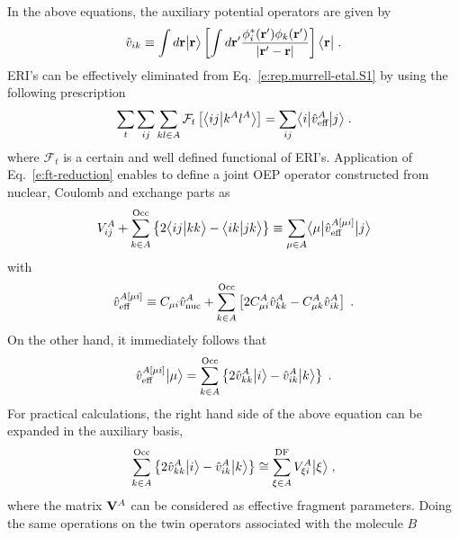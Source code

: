 %
In the above equations, the auxiliary potential operators are given by
%
\begin{equation}
  \hat{v}_{ik} \equiv \int d{\bf r} \Ket{{\bf r}} 
        \left[
        \int d{\bf r}' \frac{\phi_i^{*}({\bf r}') \phi_k({\bf r}')}{\vert {\bf r}' - {\bf r}\vert}
        \right] \Bra{{\bf r}} \;.
\end{equation}
%
ERI's can be effectively eliminated from Eq.~\eqref{e:rep.murrell-etal.S1} 
by using the following prescription~\cite{Blasiak.Bednarska.Choluj.Bartkowiak.JCP.2019}
%
\begin{equation} \label{e:ft-reduction}
	\sum_t \sum_{ij}\sum_{kl\in A} {\mathcal{F}}_t\left[ 
   \BraKet{ij}{k^Al^A}
 \right] = \sum_{ij} \tBraKet{i}{\hat{v}_{\text{eff}}^A}{j} \;.
\end{equation}
%
where ${\mathcal{F}}_t$ is a certain and well defined functional of ERI's.
Application of Eq.~\eqref{e:ft-reduction} enables to define
a joint OEP
operator constructed from nuclear, Coulomb and exchange parts 
as
%
\begin{equation}
 V^A_{ij} + 
 \sum_{k\in A}^{\rm Occ} 
  \left\{ 2\BraKet{ij}{kk} - \BraKet{ik}{jk} \right\}
\equiv \sum_{\mu\in A} \tBraKet{\mu}{ 
\hat{v}^{A[\mu i]}_{\rm eff}
 }{j}
\end{equation}
%
with
%
\begin{equation}
 \hat{v}^{A[\mu i]}_{\rm eff} \equiv C_{\mu i} \hat{v}^A_{\rm nuc} + 
 \sum_{k\in A}^{\rm Occ} \left[
 2C_{\mu i}^A \hat{v}^A_{kk} - C_{\mu k}^A \hat{v}^A_{ik}
 \right] \;.
\end{equation}
%
%
%
On the other hand, it immediately follows that
%
\begin{equation}
 \hat{v}^{A[\mu i]}_{\rm eff} \Ket{\mu} = 
  \sum_{k\in A}^{\rm Occ} \left\{
     2\hat{v}^A_{kk} \Ket{i} - \hat{v}^A_{ik} \Ket{k}
  \right\} \;.
\end{equation}
%
For practical calculations, the right hand side of the above equation can be expanded 
in the auxiliary basis,
%
\begin{equation} \label{e:v-oep.rep}
  \sum_{k\in A}^{\rm Occ} \left\{
     2\hat{v}^A_{kk} \Ket{i} - \hat{v}^A_{ik} \Ket{k}
  \right\} \cong
  \sum_{\xi\in A}^{\rm DF} 
  V_{\xi i}^A \Ket{\xi} \;,
\end{equation}
%
where the matrix ${\bf V}^A$ can be considered as effective fragment parameters.
Doing the same operations on the twin operators associated with the molecule $B$
